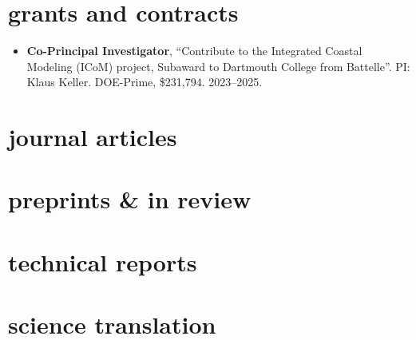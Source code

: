 \documentclass[10pt,oneside]{article}
\begin{document}

\section{grants and contracts}

\mbox{}\vspace{-\dimexpr\baselineskip\relax}

\begin{itemize}[label={}]
  
  \item \textbf{Co-Principal Investigator}, \enquote{Contribute to the Integrated Coastal Modeling (ICoM) project, Subaward to Dartmouth College from Battelle}.  PI: Klaus Keller. {DOE-Prime}, \$231,794. 2023--2025.
        
\end{itemize}


\section{journal articles}

\mbox{}\vspace{-\dimexpr\baselineskip\relax}
\vspace*{-1em}

\uspunctuation

\printbibliography[type=article, heading=none]

\section{preprints \& in review}

\mbox{}\vspace{-\dimexpr\baselineskip\relax}
\vspace*{-1em}
\printbibliography[type=unpublished, heading=none]

\section{technical reports}

\mbox{}\vspace{-\dimexpr\baselineskip\relax}
\vspace*{-1em}
\printbibliography[type=report, heading=none]

\section{science translation}
\end{document}
